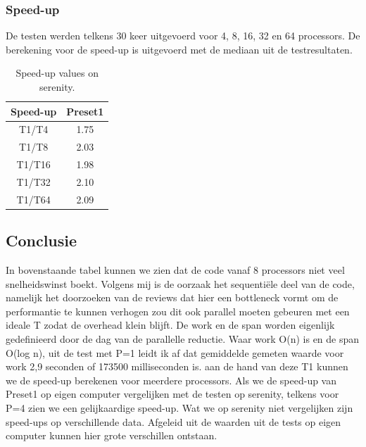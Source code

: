 \documentclass[]{article}
\begin{document}
\subsubsection{Speed-up}
De testen werden telkens 30 keer uitgevoerd voor 4, 8, 16, 32 en 64 processors.
De berekening voor de speed-up is uitgevoerd met de mediaan uit de testresultaten. 

\begin{table}[h!]
	\centering
	\begin{tabular}{|c|c|}
		\hline 
		Speed-up & Preset1 \\ 
		\hline 
		T1/T4 & 1.75 \\ 
		\hline 
		T1/T8 & 2.03 \\ 
		\hline 
		T1/T16 & 1.98 \\ 
		\hline
		T1/T32 & 2.10 \\ 
		\hline
		T1/T64 & 2.09 \\ 
		\hline
	\end{tabular} 
	\caption{Speed-up values on serenity.}
	\label{table:3}
\end{table}

\subsection{Conclusie}
In bovenstaande tabel kunnen we zien dat de code vanaf 8 processors niet veel snelheidswinst boekt.
Volgens mij is de oorzaak het sequentiële deel van de code, namelijk het doorzoeken van de reviews dat hier een bottleneck vormt om de performantie te kunnen verhogen zou dit ook parallel moeten gebeuren met een ideale T zodat de overhead klein blijft. 
De work en de span worden eigenlijk gedefinieerd door de dag van de parallelle reductie.
Waar work O(n) is en de span O(log n), uit de test met P=1 leidt ik af dat gemiddelde gemeten waarde voor work 2,9 seconden of 173500 milliseconden is. aan de hand van deze T1 kunnen we de speed-up berekenen voor meerdere processors. Als we de speed-up van Preset1 op eigen computer vergelijken met de testen op serenity, telkens voor P=4 zien we een gelijkaardige speed-up. Wat we op serenity niet vergelijken zijn speed-ups op verschillende data. Afgeleid uit de waarden uit de tests op eigen computer kunnen hier grote verschillen ontstaan.
\end{document}
